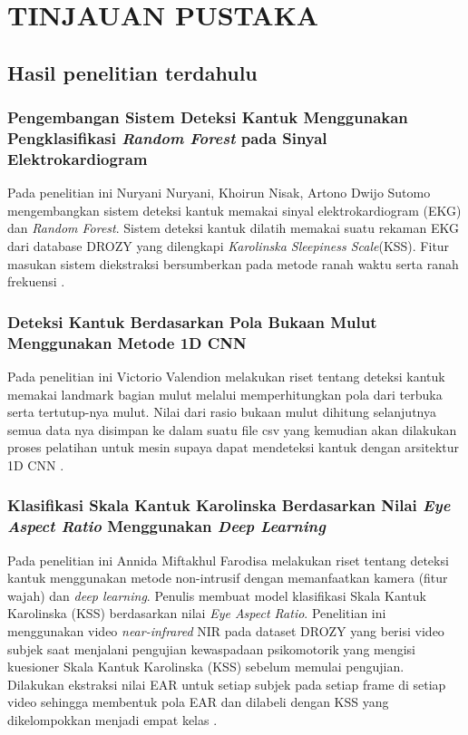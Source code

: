 \chapter{TINJAUAN PUSTAKA}
\label{chap:tinjauanpustaka}


\section{Hasil penelitian terdahulu}
\subsection{Pengembangan Sistem Deteksi Kantuk Menggunakan Pengklasifikasi \emph{Random Forest} pada Sinyal Elektrokardiogram}
Pada penelitian ini Nuryani Nuryani, Khoirun Nisak, Artono Dwijo Sutomo mengembangkan   sistem   deteksi   kantuk
memakai   sinyal elektrokardiogram  (EKG)  dan \emph{Random  Forest}. Sistem  deteksi kantuk   dilatih   memakai suatu
rekaman   EKG   dari database DROZY yang dilengkapi \emph{Karolinska Sleepiness Scale}(KSS). Fitur masukan  sistem  diekstraksi
bersumberkan pada  metode ranah waktu serta ranah frekuensi \parencite{9}.

\subsection{Deteksi Kantuk Berdasarkan Pola Bukaan Mulut Menggunakan Metode 1D CNN}
Pada penelitian ini Victorio Valendion melakukan riset tentang deteksi kantuk memakai landmark bagian mulut melalui
memperhitungkan pola dari terbuka serta tertutup-nya mulut. Nilai dari rasio bukaan mulut dihitung selanjutnya
semua data nya disimpan ke dalam suatu file csv yang kemudian akan dilakukan proses pelatihan untuk mesin
supaya dapat mendeteksi kantuk dengan arsitektur 1D CNN \parencite{10}.

\subsection{Klasifikasi Skala Kantuk Karolinska Berdasarkan Nilai \emph{Eye Aspect Ratio} Menggunakan \emph{Deep Learning}}
Pada penelitian ini Annida Miftakhul Farodisa melakukan riset tentang deteksi kantuk menggunakan metode non-intrusif
dengan memanfaatkan kamera (fitur wajah) dan \emph{deep learning}. Penulis membuat model klasifikasi Skala Kantuk Karolinska
(KSS) berdasarkan nilai \emph{Eye Aspect Ratio}. Penelitian ini menggunakan video \emph{near-infrared} NIR pada dataset DROZY yang berisi video
subjek saat menjalani pengujian kewaspadaan psikomotorik yang mengisi kuesioner Skala Kantuk Karolinska (KSS) sebelum
memulai pengujian. Dilakukan ekstraksi nilai EAR untuk setiap subjek pada setiap frame di setiap video sehingga
membentuk pola EAR dan dilabeli dengan KSS yang dikelompokkan menjadi empat kelas \parencite{11}.

